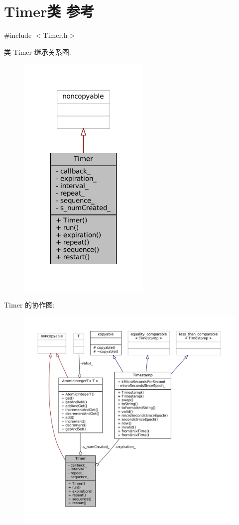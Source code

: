 \hypertarget{classmuduo_1_1Timer}{}\section{Timer类 参考}
\label{classmuduo_1_1Timer}


{\ttfamily \#include $<$Timer.\+h$>$}



类 Timer 继承关系图\+:
\nopagebreak
\begin{figure}[H]
\begin{center}
\leavevmode
\includegraphics[width=179pt]{classmuduo_1_1Timer__inherit__graph}
\end{center}
\end{figure}


Timer 的协作图\+:
\nopagebreak
\begin{figure}[H]
\begin{center}
\leavevmode
\includegraphics[width=350pt]{classmuduo_1_1Timer__coll__graph}
\end{center}
\end{figure}
